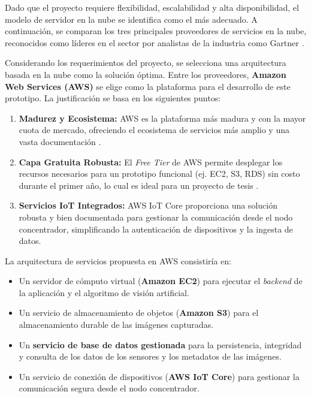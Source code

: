 Dado que el proyecto requiere flexibilidad, escalabilidad y alta disponibilidad, el modelo de servidor en la nube se identifica como el más adecuado. A continuación, se comparan los tres principales proveedores de servicios en la nube, reconocidos como líderes en el sector por analistas de la industria como Gartner \cite{gartner2023magic}.




Considerando los requerimientos del proyecto, se selecciona una arquitectura basada en la nube como la solución óptima. Entre los proveedores, \textbf{Amazon Web Services (AWS)} se elige como la plataforma para el desarrollo de este prototipo. La justificación se basa en los siguientes puntos:

\begin{enumerate}
    \item \textbf{Madurez y Ecosistema:} AWS es la plataforma más madura y con la mayor cuota de mercado, ofreciendo el ecosistema de servicios más amplio y una vasta documentación \cite{coursera2024}.
    \item \textbf{Capa Gratuita Robusta:} El \textit{Free Tier} de AWS permite desplegar los recursos necesarios para un prototipo funcional (ej. EC2, S3, RDS) sin costo durante el primer año, lo cual es ideal para un proyecto de tesis \cite{aws2024freetier}.
    \item \textbf{Servicios IoT Integrados:} AWS IoT Core proporciona una solución robusta y bien documentada para gestionar la comunicación desde el nodo concentrador, simplificando la autenticación de dispositivos y la ingesta de datos.
\end{enumerate}

La arquitectura de servicios propuesta en AWS consistiría en:
\begin{itemize}
    \item Un servidor de cómputo virtual (\textbf{Amazon EC2}) para ejecutar el \textit{backend} de la aplicación y el algoritmo de visión artificial.
    \item Un servicio de almacenamiento de objetos (\textbf{Amazon S3}) para el almacenamiento durable de las imágenes capturadas.
    \item Un \textbf{servicio de base de datos gestionada} para la persistencia, integridad y consulta de los datos de los sensores y los metadatos de las imágenes.
    \item Un servicio de conexión de dispositivos (\textbf{AWS IoT Core}) para gestionar la comunicación segura desde el nodo concentrador.
\end{itemize}

